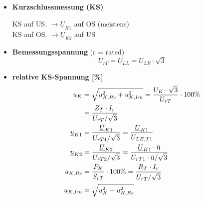 \begin{itemize}
\item[] {\textbf{Kurzschlussmessung (KS)}}

\setlength\parindent{20pt}\indent KS auf US. $\rightarrow  \underline{U}_{K1}$ auf OS (meistens)\\
\indent KS auf OS. $\rightarrow \underline{U}_{K2}$ auf US\\

    \item[]{\textbf{Bemessungsspannung} (r = rated)}
    \[
    U_{rT} = U_{LL} = U_{LE} \cdot \sqrt{3}
    \]

    \item[]{\textbf{relative KS-Spannung [\%]}}
    \begin{align*}
        u_K  &= \sqrt{u^2_{K,Re}+u^2_{K,Im}}
             = \frac{U_K\cdot \sqrt{3}}{U_{rT}}\cdot 100\%\\
             &= \frac{Z_T \cdot I_r}{U_{rT}/\sqrt{3}}\\
    \underline{u}_{K1}  &= \frac{\underline{U}_{K1}}{ U_{rT1}/\sqrt{3} } =\frac{\underline{U}_{K1}}{U_{LE,T1}}\\
    \underline{u}_{K2} &= \frac{\underline{U}_{K2}}{ U_{rT2}/\sqrt{3}} = \frac{\underline{U}_{K1} \cdot \textnormal{ü}}{ U_{rT1} \cdot \textnormal{ü}/\sqrt{3}}\\
    u_{K,Re}      &= \frac{P_{K}}{S_{rT}}\cdot 100\%=\frac{R_T \cdot I_r}{U_{rT}/\sqrt{3}}\\
    u_{K,Im}  &= \sqrt{u^2_{K}-u^2_{K,Re}}
    \end{align*}


\end{itemize}
